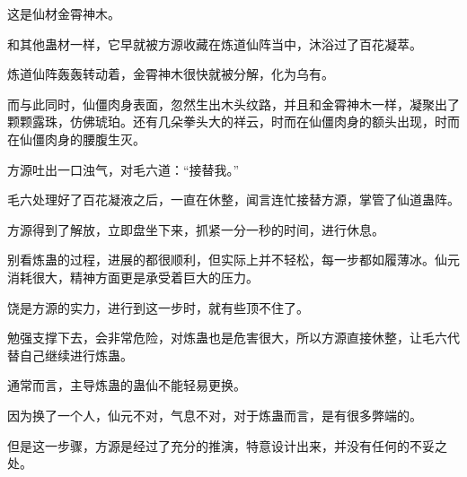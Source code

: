 \begin{this_body}
这是仙材金霄神木。

和其他蛊材一样，它早就被方源收藏在炼道仙阵当中，沐浴过了百花凝萃。

炼道仙阵轰轰转动着，金霄神木很快就被分解，化为乌有。

而与此同时，仙僵肉身表面，忽然生出木头纹路，并且和金霄神木一样，凝聚出了颗颗露珠，仿佛琥珀。还有几朵拳头大的祥云，时而在仙僵肉身的额头出现，时而在仙僵肉身的腰腹生灭。

方源吐出一口浊气，对毛六道：“接替我。”

毛六处理好了百花凝液之后，一直在休整，闻言连忙接替方源，掌管了仙道蛊阵。

方源得到了解放，立即盘坐下来，抓紧一分一秒的时间，进行休息。

别看炼蛊的过程，进展的都很顺利，但实际上并不轻松，每一步都如履薄冰。仙元消耗很大，精神方面更是承受着巨大的压力。

饶是方源的实力，进行到这一步时，就有些顶不住了。

勉强支撑下去，会非常危险，对炼蛊也是危害很大，所以方源直接休整，让毛六代替自己继续进行炼蛊。

通常而言，主导炼蛊的蛊仙不能轻易更换。

因为换了一个人，仙元不对，气息不对，对于炼蛊而言，是有很多弊端的。

但是这一步骤，方源是经过了充分的推演，特意设计出来，并没有任何的不妥之处。

\end{this_body}

